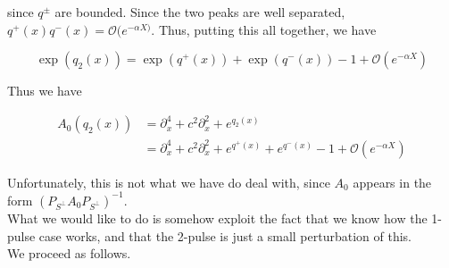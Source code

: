 \documentclass[12pt]{article}
\begin{document}
since $q^\pm$ are bounded. Since the two peaks are well separated, $q^+(x)q^-(x) = \mathcal{O}(e^{-\alpha X)}$. Thus, putting this all together, we have

\begin{equation}
\exp(q_2(x)) = \exp( q^+(x)) + \exp(q^-(x)) - 1 + \mathcal{O}(e^{-\alpha X}) 
\end{equation}

Thus we have

\begin{align*}
A_0(q_2(x)) &= \partial_x^4 + c^2 \partial_x^2 + e^{q_2(x)} \\
&= \partial_x^4 + c^2 \partial_x^2 + e^{q^+(x)} + e^{q^-(x)} - 1 + \mathcal{O}(e^{-\alpha X})
\end{align*}

Unfortunately, this is not what we have do deal with, since $A_0$ appears in the form $(P_{S^\perp}A_0 P_{S^\perp})^{-1}$.\\

What we would like to do is somehow exploit the fact that we know how the 1-pulse case works, and that the 2-pulse is just a small perturbation of this.\\

We proceed as follows.
\end{document}
